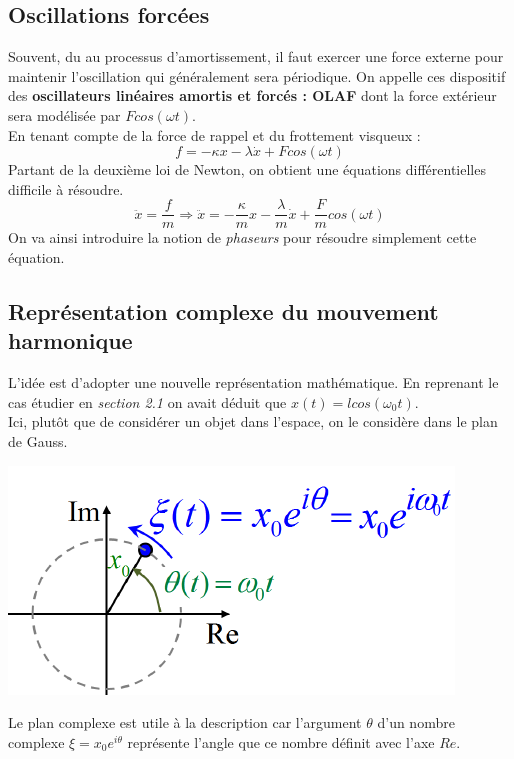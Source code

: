 \documentclass	[11pt, a4paper, openany]{book}
\begin{document}
\subsection{Oscillations forcées}
Souvent, du au processus d'amortissement, il faut exercer une force externe pour maintenir l'oscillation qui généralement sera périodique. On appelle ces dispositif des \textbf{oscillateurs linéaires amortis et forcés : OLAF} dont la force extérieur sera modélisée par $Fcos(\omega t)$.\\
En tenant compte de la force de rappel et du frottement visqueux :
\begin{equation}
f = -\kappa x - \lambda \dot{x} + Fcos(\omega t)
\end{equation}
Partant de la deuxième loi de Newton, on obtient une équations différentielles difficile à résoudre.
\begin{equation}
\ddot{x} = \frac{f}{m} \Rightarrow \ddot{x} = -\frac{\kappa}{m}x - \frac{\lambda}{m}\dot{x} + \frac{F}{m}cos(\omega t)
\end{equation}
On va ainsi introduire la notion de \textit{phaseurs} pour résoudre simplement cette équation.

\subsection{Représentation complexe du mouvement harmonique}
L'idée est d'adopter une nouvelle représentation mathématique. En reprenant le cas étudier en \textit{section 2.1} on avait déduit que $x(t) = lcos(\omega_0 t)$.\\
Ici, plutôt que de considérer un objet dans l'espace, on le considère dans le plan de Gauss.

\begin{center}
\includegraphics[scale=0.45]{oo/image11.png}
\end{center}
Le plan complexe est utile à la description car l'argument $\theta$ d'un nombre complexe $\xi = x_0e^{i\theta}$ représente l'angle que ce nombre définit avec l'axe $Re$.\\
\end{document}
